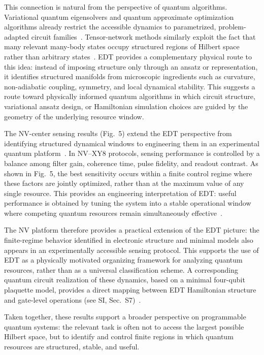 \documentclass[twocolumn,10pt]{article}
\begin{document}
This connection is natural from the perspective of quantum algorithms. Variational quantum eigensolvers and quantum approximate optimization algorithms already restrict the accessible dynamics to parametrized, problem-adapted circuit families~\cite{Peruzzo2014,Farhi2014}. Tensor-network methods similarly exploit the fact that many relevant many-body states occupy structured regions of Hilbert space rather than arbitrary states~\cite{Schollwock2011}. EDT provides a complementary physical route to this idea: instead of imposing structure only through an ansatz or representation, it identifies structured manifolds from microscopic ingredients such as curvature, non-adiabatic coupling, symmetry, and local dynamical stability. This suggests a route toward physically informed quantum algorithms in which circuit structure, variational ansatz design, or Hamiltonian simulation choices are guided by the geometry of the underlying resource window.

The NV-center sensing results (Fig.~5) extend the EDT perspective from identifying structured dynamical windows to engineering them in an experimental quantum platform~\cite{Degen2017,Barry2020}. In NV--XY8 protocols, sensing performance is controlled by a balance among filter gain, coherence time, pulse fidelity, and readout contrast. As shown in Fig.~5, the best sensitivity occurs within a finite control regime where these factors are jointly optimized, rather than at the maximum value of any single resource. This provides an engineering interpretation of EDT: useful performance is obtained by tuning the system into a stable operational window where competing quantum resources remain simultaneously effective~\cite{Casola2018}.

The NV platform therefore provides a practical extension of the EDT picture: the finite-regime behavior identified in electronic structure and minimal models also appears in an experimentally accessible sensing protocol. This supports the use of EDT as a physically motivated organizing framework for analyzing quantum resources, rather than as a universal classification scheme. A corresponding quantum circuit realization of these dynamics, based on a minimal four-qubit plaquette model, provides a direct mapping between EDT Hamiltonian structure and gate-level operations (see SI, Sec.~S7)~\cite{Lloyd1996,Childs2019}.

Taken together, these results support a broader perspective on programmable quantum systems: the relevant task is often not to access the largest possible Hilbert space, but to identify and control finite regions in which quantum resources are structured, stable, and useful.
\end{document}
